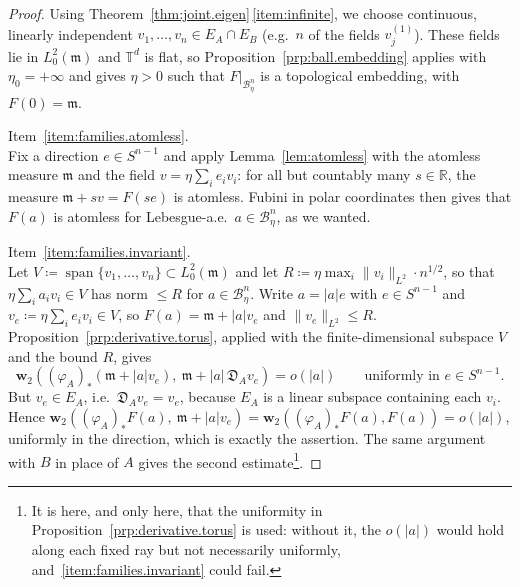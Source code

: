 \documentclass[11pt,reqno]{amsart}
\theoremstyle{plain}
\theoremstyle{definition}
\newcommand{\dw}{\mathbf{w}_2}
\newcommand{\T}{\mathbb{T}}
\newcommand{\R}{\mathbb{R}}
\newcommand{\Leb}{\mathfrak{m}}
\newcommand{\D}{\mathfrak{D}}
\begin{document}
\begin{proof}
    Using Theorem~\ref{thm:joint.eigen}\,\ref{item:infinite}, we choose continuous, linearly independent \( v_1,\dots,v_n\in E_A\cap E_B \) (e.g.\ \( n \) of the fields \( v_j^{(1)} \)).
    These fields lie in \(L^2_0(\Leb)\) and \(\T^d\) is flat, so Proposition~\ref{prp:ball.embedding} applies with \(\eta_0=+\infty\) and gives \(\eta>0\) such that \(F|_{\mathcal B^n_\eta}\) is a topological embedding, with \(F(0)=\Leb\).

    \medskip
    \noindent Item~\ref{item:families.atomless}.\\
    Fix a direction \( e\in S^{n-1} \) and apply Lemma~\ref{lem:atomless} with the atomless measure \( \Leb \) and the field \( v=\eta\sum_ie_iv_i \): for all but countably many \( s\in\R \), the measure \( \Leb+sv=F(se) \) is atomless.
    Fubini in polar coordinates then gives that \( F(a) \) is atomless for Lebesgue-a.e.\ \( a\in \mathcal{B}^n_\eta \), as we wanted.

    \medskip
    \noindent Item~\ref{item:families.invariant}. \\
    Let \(V\coloneqq \operatorname{span}\{v_1,\dots,v_n\}\subset L^2_0(\Leb)\) and let \(R\coloneqq \eta\max_i\lVert v_i \rVert_{L^2} \cdot n^{1/2}\), so that \( \eta\sum_ia_iv_i\in V \) has norm \( \le R \) for \( a\in \mathcal{B}^n_\eta \).
    Write \( a=\lvert a \rvert e \) with \( e\in S^{n-1} \) and \( v_e\coloneqq \eta\sum_ie_iv_i\in V \), so \( F(a)=\Leb+\lvert a \rvert v_e \) and \( \lVert v_e \rVert_{L^2}\le R \).
    Proposition~\ref{prp:derivative.torus}, applied with the finite-dimensional subspace \( V \) and the bound \( R \), gives
    \[
        \dw\left(( \varphi_A )_\ast \left(\Leb+\lvert a \rvert v_e\right),\ \Leb+\lvert a \rvert\,\D_A v_e\right)= o(\lvert a \rvert)\qquad\text{uniformly in } e\in S^{n-1} .
    \]
    But \( v_e\in E_A \), i.e.\ \( \D_Av_e=v_e \), because \( E_A \) is a linear subspace containing each \( v_i \).
    Hence \( \dw\left(( \varphi_A )_\ast F(a),\ \Leb+\lvert a \rvert v_e\right)=\dw\left(( \varphi_A )_\ast F(a),F(a)\right) =o(\lvert a \rvert) \), uniformly in the direction, which is exactly the assertion.
    The same argument with \( B \) in place of \( A \) gives the second estimate\footnote{
        It is here, and only here, that the uniformity in Proposition~\ref{prp:derivative.torus} is used: without it, the \( o(\lvert a \rvert) \) would hold along each fixed ray but not necessarily uniformly, and~\ref{item:families.invariant} could fail.
    }.


\end{proof}
\end{document}
